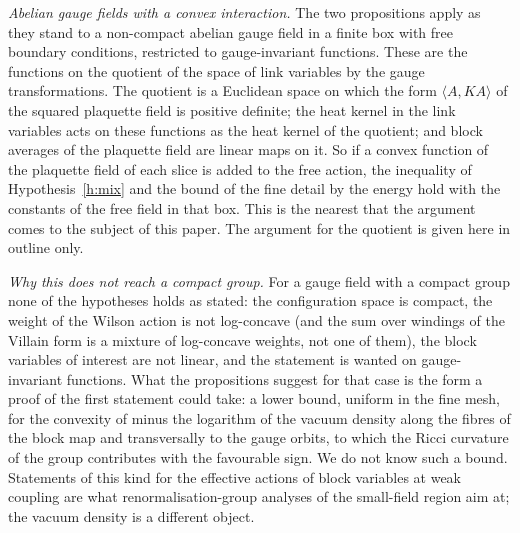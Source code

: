 \emph{Abelian gauge fields with a convex interaction.} The two propositions apply as they stand to a
non-compact abelian gauge field in a finite box with free boundary conditions, restricted to gauge-invariant
functions. These are the functions on the quotient of the space of link variables by the gauge
transformations. The quotient is a Euclidean space on which the form $\langle A,KA\rangle$ of the squared
plaquette field is positive definite; the heat kernel in the link variables acts on these functions as the
heat kernel of the quotient; and block averages of the plaquette field are linear maps on it. So if a
convex function of the plaquette field of each slice is added to the free action, the inequality of
Hypothesis~\ref{h:mix} and the bound of the fine detail by the energy hold with the constants of the free
field in that box. This is the nearest that the argument comes to the subject of this paper. The argument
for the quotient is given here in outline only.

\emph{Why this does not reach a compact group.} For a gauge field with a compact group none of the
hypotheses holds as stated: the configuration space is compact, the weight of the Wilson action is not
log-concave (and the sum over windings of the Villain form is a mixture of log-concave weights, not one of
them), the block variables of interest are not linear, and the statement is wanted on gauge-invariant
functions. What the propositions suggest for that case is the form a proof of the first statement could
take: a lower bound, uniform in the fine mesh, for the convexity of minus the logarithm of the vacuum
density along the fibres of the block map and transversally to the gauge orbits, to which the Ricci
curvature of the group contributes with the favourable sign. We do not know such a bound. Statements of this
kind for the effective actions of block variables at weak coupling are what renormalisation-group analyses
of the small-field region aim at; the vacuum density is a different object.


